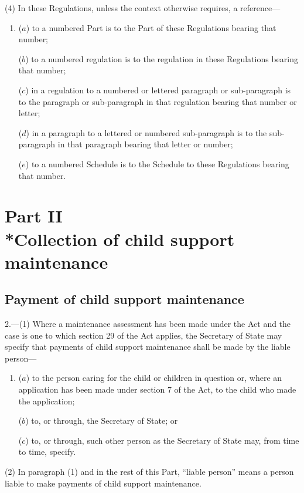 \documentclass[a4paper]{article}
\newcommand{\parthead}{}
\begin{document}
(4) In these Regulations, unless the context otherwise requires, a reference—
\begin{enumerate}\item[]
($a$) to a numbered Part is to the Part of these Regulations bearing that number;

($b$) to a numbered regulation is to the regulation in these Regulations bearing that number;

($c$) in a regulation to a numbered or lettered paragraph or sub-paragraph is to the paragraph or sub-paragraph in that regulation bearing that number or letter;

($d$) in a paragraph to a lettered or numbered sub-paragraph is to the sub-paragraph in that paragraph bearing that letter or number;

($e$) to a numbered Schedule is to the Schedule to these Regulations bearing that number.
\end{enumerate}

\section[Part II --- Collection of child support maintenance]{Part II\\*Collection of child support maintenance}

\renewcommand\parthead{--- Part II}

\subsection[2. Payment of child support maintenance]{Payment of child support maintenance}

2.—(1) Where a maintenance assessment has been made under the Act and the case is one to which section 29 of the Act applies, the Secretary of State may specify that payments of child support maintenance shall be made by the liable person—
\begin{enumerate}\item[]
($a$) to the person caring for the child or children in question or, where an application has been made under section 7 of the Act, to the child who made the application;

($b$) to, or through, the Secretary of State; or

($c$) to, or through, such other person as the Secretary of State may, from time to time, specify.
\end{enumerate}

(2) In paragraph (1) and in the rest of this Part, “liable person” means a person liable to make payments of child support maintenance.
\end{document}
